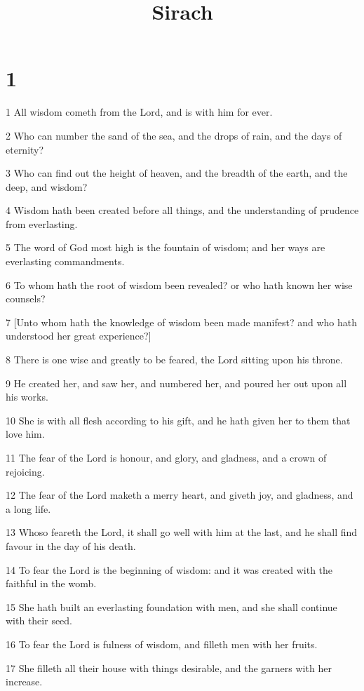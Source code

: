 

\title{Sirach}


\chapter{1}

\par 1 All wisdom cometh from the Lord, and is with him for ever.
\par 2 Who can number the sand of the sea, and the drops of rain, and the days of eternity?
\par 3 Who can find out the height of heaven, and the breadth of the earth, and the deep, and wisdom?
\par 4 Wisdom hath been created before all things, and the understanding of prudence from everlasting.
\par 5 The word of God most high is the fountain of wisdom; and her ways are everlasting commandments.
\par 6 To whom hath the root of wisdom been revealed? or who hath known her wise counsels?
\par 7 [Unto whom hath the knowledge of wisdom been made manifest? and who hath understood her great experience?]
\par 8 There is one wise and greatly to be feared, the Lord sitting upon his throne.
\par 9 He created her, and saw her, and numbered her, and poured her out upon all his works.
\par 10 She is with all flesh according to his gift, and he hath given her to them that love him.
\par 11 The fear of the Lord is honour, and glory, and gladness, and a crown of rejoicing.
\par 12 The fear of the Lord maketh a merry heart, and giveth joy, and gladness, and a long life.
\par 13 Whoso feareth the Lord, it shall go well with him at the last, and he shall find favour in the day of his death.
\par 14 To fear the Lord is the beginning of wisdom: and it was created with the faithful in the womb.
\par 15 She hath built an everlasting foundation with men, and she shall continue with their seed.
\par 16 To fear the Lord is fulness of wisdom, and filleth men with her fruits.
\par 17 She filleth all their house with things desirable, and the garners with her increase.
